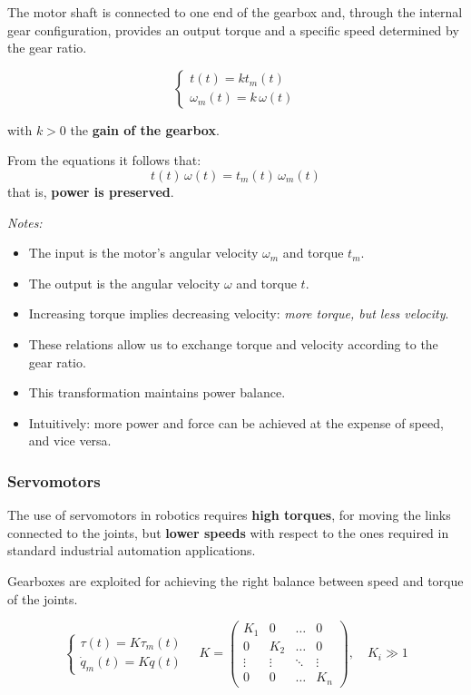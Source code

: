 The motor shaft is connected to one end of the gearbox and, through the internal gear configuration, provides an output torque and a specific speed determined by the gear ratio.  

\[
\begin{cases}
t(t) = k t_m(t) \\
\omega_m(t) = k \, \omega(t)
\end{cases}
\]

with $k > 0$ the \textbf{gain of the gearbox}.  

From the equations it follows that:
\[
t(t)\,\omega(t) = t_m(t)\,\omega_m(t)
\]
that is, \textbf{power is preserved}.  

\textit{Notes:}  
\begin{itemize}
    \item The input is the motor’s angular velocity $\omega_m$ and torque $t_m$.  
    \item The output is the angular velocity $\omega$ and torque $t$.  
    \item Increasing torque implies decreasing velocity: \textit{more torque, but less velocity}.  
    \item These relations allow us to exchange torque and velocity according to the gear ratio.  
    \item This transformation maintains power balance.  
    \item Intuitively: more power and force can be achieved at the expense of speed, and vice versa.  
\end{itemize}

\hfill

\subsubsection*{Servomotors}

The use of servomotors in robotics requires \textbf{high torques}, for moving the links connected to the joints, but \textbf{lower speeds} with respect to the ones required in standard industrial automation applications.  

Gearboxes are exploited for achieving the right balance between speed and torque of the joints.  

\[
\begin{cases}
\tau(t) = K \tau_m(t) \\
\dot{q}_m(t) = K \dot{q}(t)
\end{cases}
\quad
K = 
\begin{pmatrix}
K_1 & 0   & \dots & 0 \\
0   & K_2 & \dots & 0 \\
\vdots & \vdots & \ddots & \vdots \\
0   & 0   & \dots & K_n
\end{pmatrix}, 
\quad K_i \gg 1
\]

